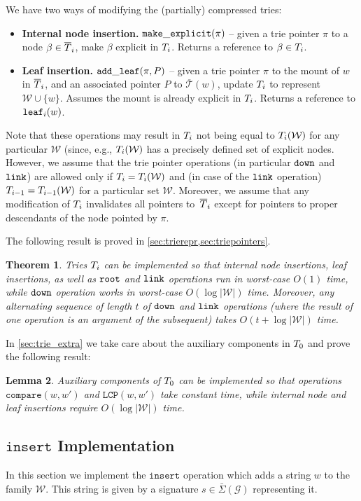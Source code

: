 \documentclass[a4paper]{article}
\newtheorem{theorem}{Theorem}[section]
\newtheorem{lemma}[theorem]{Lemma}
\theoremstyle{remark}
\newcommand{\compop}{\mathtt{compare}}
\newcommand{\lcpop}{\mathtt{LCP}}
\newcommand{\sigs}{\bar{\Sigma}}
\newcommand{\grammar}{\mathcal{G}}
\newcommand{\ustree}{\mathcal{\overline{T}}}
\newcommand{\coll}{\mathcal{W}}
\newcommand{\insertop}{\mathtt{insert}}
\begin{document}
We have two ways of modifying the (partially) compressed tries:
\begin{itemize}
  \item \textbf{Internal node insertion.} $\mathtt{make\_explicit}(\pi)$ -- given a trie pointer $\pi$ to a node $\beta \in \overline{T}_i$, make $\beta$ explicit in $T_i$.
  Returns a reference to $\beta\in T_i$.
  \item \textbf{Leaf insertion.} $\mathtt{add\_leaf}(\pi,P)$ -- given a trie pointer $\pi$ to the mount of $w$ in $\overline{T}_i$, and an associated pointer $P$ to $\ustree(w)$,
update $T_i$ to represent $\coll\cup\{w\}$. Assumes the mount is already explicit in $T_i$. Returns a reference to $\mathtt{leaf}_i(w)$.
\end{itemize}
Note that these operations may result in $T_i$ not being equal to $\trie_i(\coll)$ for any particular $\coll$ (since, e.g., $\trie_i(\coll)$
has a precisely defined set of explicit nodes.
However, we assume that the trie pointer operations (in particular $\mathtt{down}$ and $\mathtt{link}$) are allowed only if $\trie_i=\trie_i(\coll)$
and (in case of the $\mathtt{link}$ operation) $\trie_{i-1}=\trie_{i-1}(\coll)$ for a particular set $\coll$. Moreover, we assume
that any modification of $T_i$ invalidates all pointers to~$\overline{T}_i$ except for pointers to proper descendants of the node pointed by $\pi$.

The following result is proved in \cref{sec:trierepr,sec:triepointers}.
\begin{theorem}\label{thm:trie_pointers}
Tries $T_i$ can be implemented so that
internal node insertions, leaf insertions, as well as
$\mathtt{root}$ and $\mathtt{link}$ operations run in worst-case $O(1)$ time, while
$\mathtt{down}$ operation works in worst-case $O(\log |\coll|)$ time.
Moreover, any alternating sequence of length $t$ of $\mathtt{down}$ and $\mathtt{link}$ operations (where the result of one operation is an argument of the subsequent) takes $O(t+\log |\coll|)$ time.
\end{theorem}
\noindent
In \cref{sec:trie_extra} we take care about the auxiliary components in $T_0$
and prove the following result:
\begin{lemma}\label{lem:trie_extra}
Auxiliary components of $T_0$ can be implemented so that operations $\compop(w,w')$ and $\lcpop(w,w')$ take constant time,
while internal node and leaf insertions require $O(\log |\coll|)$ time.
\end{lemma}

\subsection{$\insertop$ Implementation}
In this section we implement the $\insertop$ operation which adds a string $w$ to the family $\coll$.
This string is given by a signature $s\in \sigs(\grammar)$ representing it.
\end{document}
